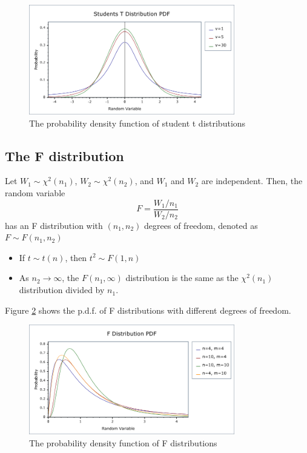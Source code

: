 \documentclass[a4paper,11pt]{article}
\begin{document}
\begin{figure}[htbp]
\centering
\includegraphics[width=0.8\textwidth]{figure/students_t_pdf.png}
\caption{\label{fig:org06949b5}
The probability density function of student t distributions}
\end{figure}

\subsection{The F distribution}
\label{sec:orgb9adc91}

Let \(W_1 \sim \chi^2(n_1)\), \(W_2 \sim \chi^2(n_2)\), and \(W_1\) and
\(W_2\) are independent. Then, the random variable
\[ F = \frac{W_1/n_1}{W_2/n_2}\]
has an F distribution with \((n_1, n_2)\) degrees of freedom, denoted as
\(F \sim F(n_1, n_2)\)

\begin{itemize}
\item If \(t \sim t(n)\), then \(t^2 \sim F(1, n)\)
\item As \(n_2 \rightarrow \infty\), the \(F(n_1, \infty)\) distribution is the
same as the \(\chi^2(n_1)\) distribution divided by \(n_1\).
\end{itemize}

Figure \ref{fig:orgfc00083} shows the p.d.f. of F distributions
with different degrees of freedom. 

\begin{figure}[htbp]
\centering
\includegraphics[width=0.8\textwidth]{figure/fisher_f_pdf.png}
\caption{\label{fig:orgfc00083}
The probability density function of F distributions}
\end{figure}
\end{document}

